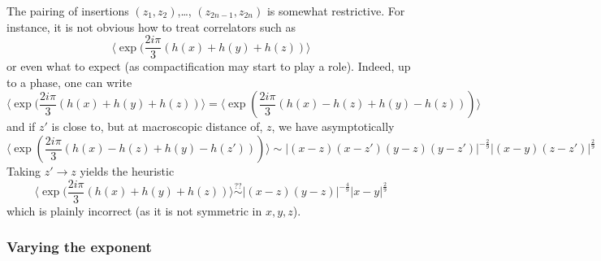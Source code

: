 \documentclass[10pt]{article}
\begin{document}
The pairing of insertions $(z_1,z_2)$,\dots, $(z_{2n-1},z_{2n})$ is somewhat restrictive. For instance, it is not obvious how to treat correlators such as 
$$\langle\exp(\frac{2i\pi}3(h(x)+h(y)+h(z))\rangle$$
or even what to expect (as compactification may start to play a role). Indeed, up to a phase, one can write
$$\langle\exp(\frac{2i\pi}3(h(x)+h(y)+h(z))\rangle
=\langle\exp(\frac{2i\pi}{3}(h(x)-h(z)+h(y)-h(z)))\rangle
$$
and if $z'$ is close to, but at macroscopic distance of, $z$, we have asymptotically
$$\langle\exp(\frac{2i\pi}{3}(h(x)-h(z)+h(y)-h(z')))\rangle
\sim |(x-z)(x-z')(y-z)(y-z')|^{-\frac 29}|(x-y)(z-z')|^{\frac 29}
$$
Taking $z'\rightarrow z$ yields the heuristic
$$\langle\exp(\frac{2i\pi}3(h(x)+h(y)+h(z))\rangle
\stackrel{??}{\sim} |(x-z)(y-z)|^{-\frac 49}|x-y|^{\frac 29}
$$
which is plainly incorrect (as it is not symmetric in $x,y,z$). 


\subsubsection{Varying the exponent}
\end{document}
